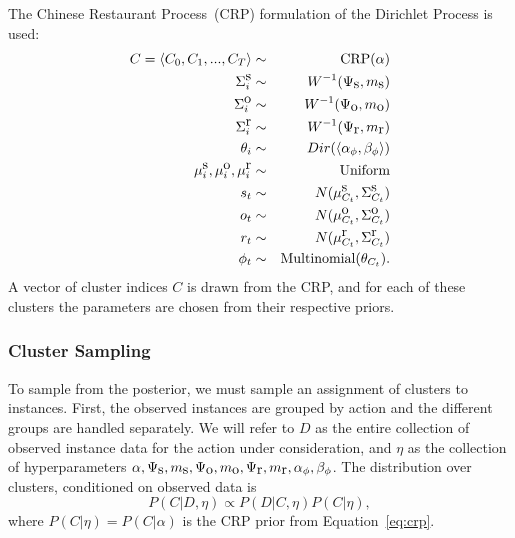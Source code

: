 The Chinese Restaurant Process~(CRP) formulation of the Dirichlet Process is used:
\begin{eqnarray*}
C=\left<C_0,C_1,...,C_T\right> &\sim& \mbox{CRP}(\alpha)\\
\Sigma^{\mbox s}_i &\sim& W^{-1}(\Psi_{\mbox s}, m_{\mbox s})\\
\Sigma^{\mbox o}_i &\sim& W^{-1}(\Psi_{\mbox o}, m_{\mbox o})\\
\Sigma^{\mbox r}_i &\sim& W^{-1}(\Psi_{\mbox r}, m_{\mbox r})\\
\theta_i &\sim& Dir(\left<\alpha_\phi, \beta_\phi\right>)\\
\mu^{\mbox s}_i,\mu^{\mbox o}_i,\mu^{\mbox r}_i &\sim& \mbox{Uniform}\\
s_t &\sim& N(\mu^{\mbox s}_{C_t},\Sigma^{\mbox s}_{C_t})\\
o_t &\sim& N(\mu^{\mbox o}_{C_t},\Sigma^{\mbox o}_{C_t})\\
r_t &\sim& N(\mu^{\mbox r}_{C_t},\Sigma^{\mbox r}_{C_t})\\
\phi_t &\sim& \mbox{Multinomial}(\theta_{C_t}).
\end{eqnarray*}
A vector of cluster indices $C$ is drawn from the CRP, and for each of these clusters the parameters are chosen from their respective priors.


\subsubsection{Cluster Sampling}

To sample from the  posterior, we must sample an assignment of clusters to instances. First, the observed instances are grouped by action and the different groups are handled separately. We will refer to $D$ as the entire collection of observed instance data for the action under consideration, and $\eta$ as the collection of hyperparameters $\alpha, \Psi_{\mbox s}, m_{\mbox s},\Psi_{\mbox o}, m_{\mbox o},\Psi_{\mbox r}, m_{\mbox r},\alpha_\phi,\beta_\phi$. The distribution over clusters, conditioned on observed data is
$$P(C|D, \eta) \propto P(D|C, \eta)P(C|\eta),$$
where $P(C|\eta)=P(C|\alpha)$ is the CRP prior from Equation~\ref{eq:crp}.

